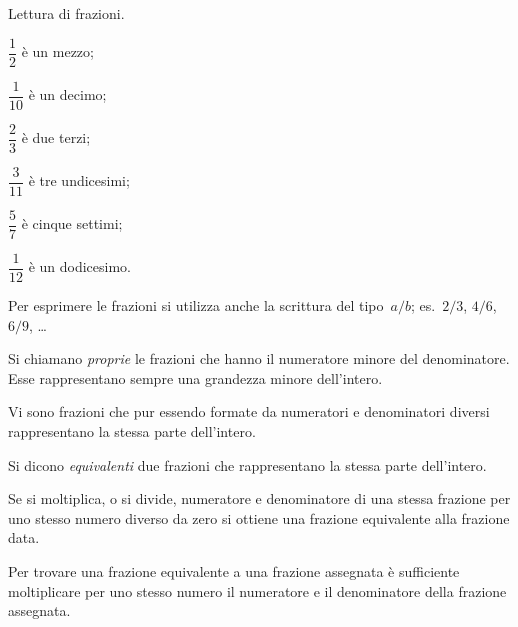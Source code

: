 \begin{exrig}
\begin{esempio}
 Lettura di frazioni.
 \begin{multicols}{3}
 \begin{enumeratea}
\item $\dfrac{1}{2}$ è un mezzo;
\item $\dfrac{1}{10}$ è un decimo;
\item $\dfrac{2}{3}$ è due terzi;
\item $\dfrac{3}{11}$ è tre undicesimi;
\item $\dfrac{5}{7}$ è cinque settimi;
\item $\dfrac{1}{12}$ è un dodicesimo.
\end{enumeratea}
\end{multicols}
\end{esempio}
\end{exrig}

Per esprimere le frazioni si utilizza anche la scrittura del tipo~$a/b$; es.~$2/3$, $4/6$, $6/9$, \ldots

 \ovalbox{\risolvii \ref{ese:3.1}, \ref{ese:3.2}, \ref{ese:3.3}, \ref{ese:3.4}}

\begin{definizione}
Si chiamano \emph{proprie} le frazioni che hanno il numeratore minore del denominatore.
Esse rappresentano sempre una grandezza minore dell'intero.
\end{definizione}

\pagebreak

Vi sono frazioni che pur essendo formate da numeratori e denominatori diversi rappresentano
la stessa parte dell'intero.
\begin{center}
 
\end{center}

\begin{definizione}
Si dicono \emph{equivalenti} due frazioni che rappresentano la stessa parte dell'intero.
\end{definizione}

\begin{proprieta}
Se si moltiplica, o si divide, numeratore e denominatore di una stessa frazione per uno stesso numero diverso da zero
si ottiene una frazione equivalente alla frazione data.
\end{proprieta}

Per trovare una frazione equivalente a una frazione assegnata è sufficiente moltiplicare per uno stesso
numero il numeratore e il denominatore della frazione assegnata.

